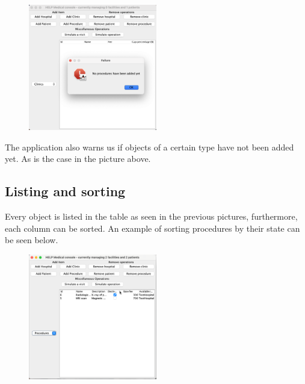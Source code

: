 \documentclass{article}
\begin{document}
\begin{figure}
  \begin{center}
    \includegraphics[width=0.5\textwidth]{./figures/Remove/Procedures_1.png}
  \end{center}
\end{figure}

The application also warns us if objects of a certain type have not been added yet. As is the case in the picture above.

\subsection{Listing and sorting}\label{sub:listing_and_sorting}
Every object is listed in the table as seen in the previous pictures, furthermore, each column can be sorted. An example of sorting procedures by their state can be seen below.
\begin{figure}
  \begin{center}
    \includegraphics[width=0.5\textwidth]{figures/Listing/Sorting.png}
  \end{center}
\end{figure}
\end{document}
